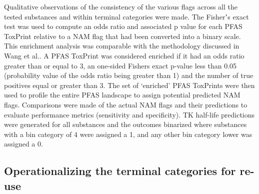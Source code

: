 \documentclass[
  super,
  preprint,
  3p]{elsarticle}
\begin{document}
Qualitative observations of the consistency of the various flags across
all the tested substances and within terminal categories were made. The
Fisher‛s exact test was used to compute an odds ratio and associated p
value for each PFAS ToxPrint \citep{richard_new_2023} relative to a NAM
flag that had been converted into a binary scale. This enrichment
analysis was comparable with the methodology discussed in Wang et
al.\citep{wang_high-throughput_2019}. A PFAS ToxPrint was considered
enriched if it had an odds ratio greater than or equal to 3, an
one-sided Fishers exact p-value less than 0.05 (probability value of the
odds ratio being greater than 1) and the number of true positives equal
or greater than 3. The set of `enriched' PFAS ToxPrints were then used
to profile the entire PFAS landscape to assign potential predicted NAM
flags. Comparisons were made of the actual NAM flags and their
predictions to evaluate performance metrics (sensitivity and
specificity). TK half-life predictions were generated for all substances
and the outcomes binarized where substances with a bin category of 4
were assigned a 1, and any other bin category lower was assigned a 0.

\hypertarget{operationalizing-the-terminal-categories-for-re-use}{%
\subsection{Operationalizing the terminal categories for
re-use}\label{operationalizing-the-terminal-categories-for-re-use}}
\end{document}
